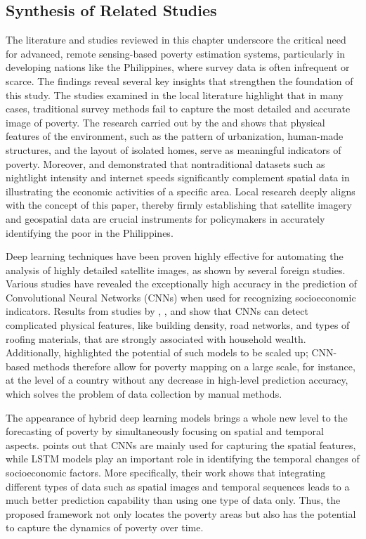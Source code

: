 \documentclass[12pt, letterpaper]{article}
\numberwithin{figure}{section}
\numberwithin{table}{section}
\begin{document}
\subsection{Synthesis of Related Studies}
The literature and studies reviewed in this chapter underscore the
critical need for advanced, remote sensing-based poverty estimation
systems, particularly in developing nations like the Philippines,
where survey data is often infrequent or scarce. The findings reveal
several key insights that strengthen the foundation of this study.
The studies examined in the local literature highlight that in many
cases, traditional survey methods fail to capture the most detailed
and accurate image of poverty. The research carried out by the
\textcite{ADB2021} and \textcite{Jimenez2025} shows that physical
features of the environment, such as the pattern of urbanization,
human-made structures, and the layout of isolated homes, serve as
meaningful indicators of poverty. Moreover, \textcite{Aragoza2022}
and \textcite{Tingzon2019} demonstrated that nontraditional datasets
such as nightlight intensity and internet speeds significantly
complement spatial data in illustrating the economic activities of a
specific area. Local research deeply aligns with the concept of this
paper, thereby firmly establishing that satellite imagery and
geospatial data are crucial instruments for policymakers in
accurately identifying the poor in the Philippines.

Deep learning techniques have been proven highly effective for
automating the analysis of highly detailed satellite images, as shown
by several foreign studies. Various studies have revealed the
exceptionally high accuracy in the prediction of Convolutional Neural
Networks (CNNs) when used for recognizing socioeconomic indicators.
Results from studies by \textcite{Saeed2023}, \textcite{Li2021}, and
\textcite{Okaidat2021} show that CNNs can detect complicated physical
features, like building density, road networks, and types of roofing
materials, that are strongly associated with household wealth.
Additionally, \textcite{Ayush2021} highlighted the potential of such
models to be scaled up; CNN-based methods therefore allow for poverty
mapping on a large scale, for instance, at the level of a country
without any decrease in high-level prediction accuracy, which solves
the problem of data collection by manual methods.

The appearance of hybrid deep learning models brings a whole new
level to the forecasting of poverty by simultaneously focusing on
spatial and temporal aspects. \textcite{SrishtiGulecha2024} points
out that CNNs are mainly used for capturing the spatial features,
while LSTM models play an important role in identifying the temporal
changes of socioeconomic factors. More specifically, their work shows
that integrating different types of data such as spatial images and
temporal sequences leads to a much better prediction capability than
using one type of data only. Thus, the proposed framework not only
locates the poverty areas but also has the potential to capture the
dynamics of poverty over time.
\end{document}
